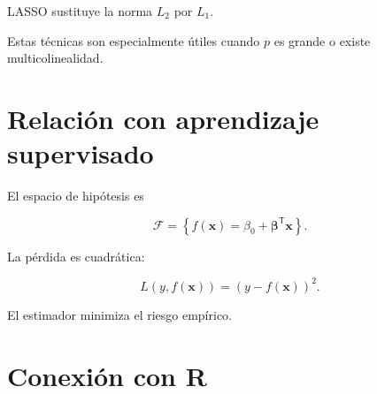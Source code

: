 \documentclass[
  spanish,
  10.5pt,
  letterpaper,
  DIV=11,
  numbers=noendperiod,
  oneside,
  open=any]{scrreprt}
\theoremstyle{definition}
\theoremstyle{definition}
\theoremstyle{plain}
\theoremstyle{remark}
\begin{document}
LASSO sustituye la norma \(L_2\) por \(L_1\).

Estas técnicas son especialmente útiles cuando \(p\) es grande o existe
multicolinealidad.

\section*{Relación con aprendizaje
supervisado}\label{relaciuxf3n-con-aprendizaje-supervisado}


El espacio de hipótesis es

\[
\mathcal{F}
=
\left\{
f(\mathbf{x})
=
\beta_0
+
\boldsymbol{\beta}^{\mathsf T}\mathbf{x}
\right\}.
\]

La pérdida es cuadrática:

\[
L(y,f(\mathbf{x}))
=
\left(
y-f(\mathbf{x})
\right)^2.
\]

El estimador minimiza el riesgo empírico.

\section*{Conexión con R}\label{conexiuxf3n-con-r-8}

\end{document}

